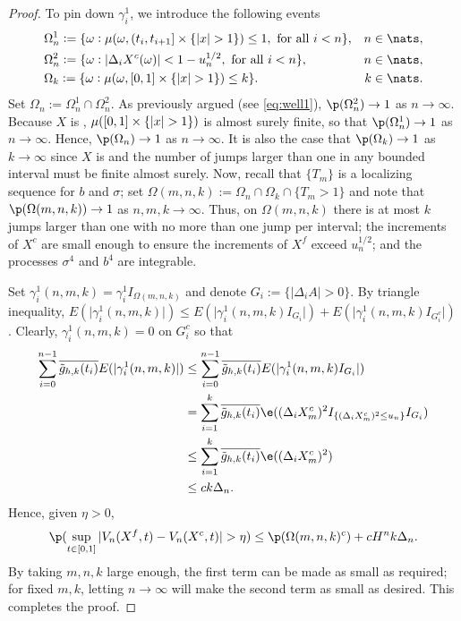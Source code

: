 \begin{proof}
To pin down $\gamma^1_i$, we introduce the following events
\begin{align}
&\Omega_n^1 := \{\omega : \mu(\omega,  (t_i, t_{i+1}] \times \{\vert x \vert > 1\} ) \le 1, \text{ for all } i <n  \}, & n \in \nats, \notag\\
&\Omega_n^2 := \{ \omega: \vert\Delta_i X^c(\omega)\vert <   1-  u_n^{1/2} , \text{ for all }i < n   \},& n \in \nats,\notag\\
&\Omega_k := \{\omega : \mu(\omega, \domain  \times \{\vert x \vert > 1\} ) \le k \}.  & k \in \nats.\notag
  \label{}
\end{align}
Set $\Omega_n := \Omega_n^1 \cap \Omega_n^2$.  As previously argued (see \eqref{eq:well1}), $\p(\Omega^2_n) \to 1$ as $n \to \infty$.  Because $X$ is \cadlag, $\mu(  [0,1] \times \{\vert x \vert > 1\} ) $ is almost surely finite, so that  $\p(\Omega^1_n) \to 1$ as $n \to \infty$.    Hence, $\p(\Omega_n) \to 1$ as $n \to \infty$. It is also the case that $\p(\Omega_k) \to 1$ as $k \to \infty$ since $X$ is \cadlag and the number of jumps larger than one in any bounded interval must be finite almost surely. Now, recall that $\{T_m \}$ is a localizing sequence for $b$ and $\sigma$;  set $\Omega(m,n,k) := \Omega_n \cap \Omega_k \cap \{T_m > 1\}$ and note that $\p(\Omega(m,n,k)) \to 1$ as $n,m, k \to \infty$.  Thus, on $\Omega(m,n,k)$ there is at most $k$ jumps larger than  one with no more than one  jump per interval; the increments of $X^c$ are small enough to ensure the increments of $X^f$ exceed $u_n^{1/2}$; and the processes $\sigma^4$ and $b^4$ are integrable. 

Set $\gamma^1_i(n, m, k) = \gamma^1_i I_{\Omega(m,n,k)}$  and  denote  $G_i := \{\vert \Delta_i A\vert  > 0\}$. By triangle inequality,  $E(\vert \gamma_i^1(n, m, k) \vert) \le E(\vert \gamma_i^1(n, m, k)  I_{G_i}\vert)  + E(\vert \gamma_i^1(n,m, k) I_{G^c_i}\vert)$. Clearly, $\gamma^1_i(n,m, k) = 0$ on $G^c_i$  so that 
\begin{align}
\sum_{i =0}^{n-1} \btghki E(\vert \gamma_i^1(n,m, k) \vert) & \le\sum_{i =0}^{n-1} \btghki E(\vert \gamma_i^1(n,m, k) I_{G_i}\vert) \notag\\
 & =  \sum_{i =1}^{k} \btghki\e( (\dxc_m)^2 I_{\{(\dxc_m)^2 \le u_n\}}I_{G_i})\notag\\
 &\le \sum_{i =1}^{k} \btghki\e((\dxc_m)^2)\notag \\
 &\le c k \Delta_n\notag.
  \label{}
\end{align}
Hence, given $\eta > 0$, 
\begin{align}
  \p(\sup_{t \in \domain} \vert V_n(X^f,t)  - V_n(X^c, t) \vert > \eta) \le \p(\Omega(m,n,k)^c) + c H^n k \Delta_n.\notag
  \label{}
\end{align}
By taking $m,n,k$ large enough, the first term can be made as small as required; for fixed $m,k$, letting $n\to \infty$ will make the second term as small as desired. This completes the proof. 
\end{proof}
